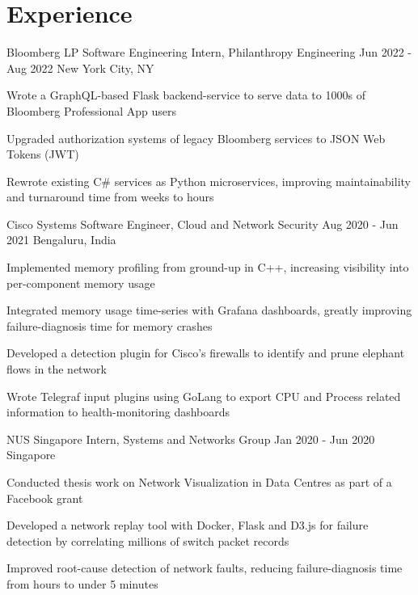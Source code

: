 \section{Experience}
\resumeSubHeadingListStart

\resumeExp
{Bloomberg LP}
{Software Engineering Intern, Philanthropy Engineering}
{Jun 2022 - Aug 2022}
{New York City, NY}

\resumeItemListStart
\item[$\bullet$] Wrote a GraphQL-based Flask backend-service to serve data to 1000s of Bloomberg Professional App users
\item[$\bullet$] Upgraded authorization systems of legacy Bloomberg services to JSON Web Tokens (JWT)
\item[$\bullet$] Rewrote existing C\# services as Python microservices, improving maintainability and turnaround time from weeks to hours
\resumeItemListEnd


\resumeExp
{Cisco Systems}
{Software Engineer, Cloud and Network Security}
{Aug 2020 - Jun 2021}
{Bengaluru, India}

\resumeItemListStart
\item[$\bullet$] Implemented memory profiling from ground-up in C++, increasing visibility into per-component memory usage
        \item[$\bullet$] Integrated memory usage time-series with Grafana dashboards, greatly improving failure-diagnosis time for memory crashes
        \item[$\bullet$] Developed a detection plugin for Cisco's firewalls to identify and prune elephant flows in the network
        \item[$\bullet$] Wrote Telegraf input plugins using GoLang to export CPU and Process related information to health-monitoring dashboards
\resumeItemListEnd

\resumeExp
{NUS Singapore}
{Intern, Systems and Networks Group}
{Jan 2020 - Jun 2020}
{Singapore}

\resumeItemListStart
\item[$\bullet$] {Conducted thesis work on Network Visualization in Data Centres as part of a Facebook grant}
	    \item[$\bullet$] {Developed a network replay tool with Docker, Flask and D3.js for failure detection by correlating millions of switch packet records}
	    \item[$\bullet$] {Improved root-cause detection of network faults, reducing failure-diagnosis time from hours to under 5 minutes} 
\resumeItemListEnd

